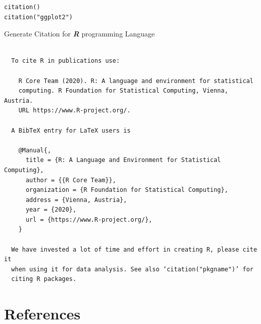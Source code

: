 \documentclass[11pt]{article}
\begin{document}
\begin{listing}[htbp]
\begin{verbatim}
citation()
citation("ggplot2")
\end{verbatim}
\caption{\label{orgf1b0f83}Generate Citation for \textbf{\emph{R}} programming Language}
\end{listing}

\begin{verbatim}

  To cite R in publications use:

    R Core Team (2020). R: A language and environment for statistical
    computing. R Foundation for Statistical Computing, Vienna, Austria.
    URL https://www.R-project.org/.

  A BibTeX entry for LaTeX users is

    @Manual{,
      title = {R: A Language and Environment for Statistical Computing},
      author = {{R Core Team}},
      organization = {R Foundation for Statistical Computing},
      address = {Vienna, Austria},
      year = {2020},
      url = {https://www.R-project.org/},
    }

  We have invested a lot of time and effort in creating R, please cite it
  when using it for data analysis. See also ‘citation("pkgname")’ for
  citing R packages.
\end{verbatim}

\section{References}
\label{sec:org94fe7ac}
\label{orgfe4e1ed}


\label{orgbdec600}
 
\end{document}

